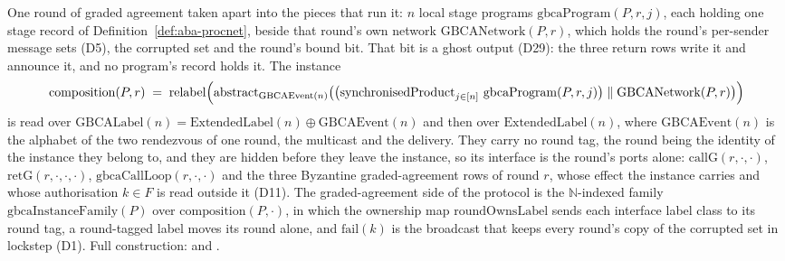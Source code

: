 \begin{definition}
  \label{def:aba-gbcasub}
  \leanok
  One round of graded agreement taken apart into the pieces that run it: $n$ local stage programs $\mathrm{gbcaProgram}(P,r,j)$, each holding one stage record of Definition~\ref{def:aba-procnet}, beside that round's own network $\mathrm{GBCANetwork}(P,r)$, which holds the round's per-sender message sets (D5), the corrupted set and the round's bound bit.
  That bit is a ghost output (D29): the three return rows write it and announce it, and no program's record holds it.
  The instance
  \[
    \mathrm{composition}(P,r) \;=\; \mathrm{relabel}\Bigl(
      \mathrm{abstract}_{\mathrm{GBCAEvent}(n)}\bigl(
        \bigl(\mathrm{synchronisedProduct}_{j \in [n]}\ \mathrm{gbcaProgram}(P,r,j)\bigr)
          \parallel \mathrm{GBCANetwork}(P,r)\bigr)\Bigr)
  \]
  is read over $\mathrm{GBCALabel}(n) = \mathrm{ExtendedLabel}(n) \oplus \mathrm{GBCAEvent}(n)$ and then over $\mathrm{ExtendedLabel}(n)$, where $\mathrm{GBCAEvent}(n)$ is the alphabet of the two rendezvous of one round, the multicast and the delivery.
  They carry no round tag, the round being the identity of the instance they belong to, and they are hidden before they leave the instance, so its interface is the round's ports alone: $\mathrm{callG}(r,\cdot,\cdot)$, $\mathrm{retG}(r,\cdot,\cdot,\cdot)$, $\mathrm{gbcaCallLoop}(r,\cdot,\cdot)$ and the three Byzantine graded-agreement rows of round $r$, whose effect the instance carries and whose authorisation $k \in F$ is read outside it (D11).
  The graded-agreement side of the protocol is the $\mathbb{N}$-indexed family $\mathrm{gbcaInstanceFamily}(P)$ over $\mathrm{composition}(P,\cdot)$, in which the ownership map $\mathrm{roundOwnsLabel}$ sends each interface label class to its round tag, a round-tagged label moves its round alone, and $\mathrm{fail}(k)$ is the broadcast that keeps every round's copy of the corrupted set in lockstep (D1).
  Full construction:  and .
\end{definition}
